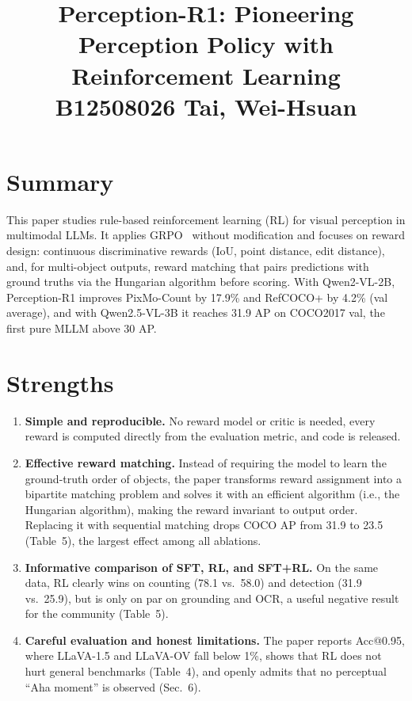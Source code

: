 \documentclass[10pt,twocolumn,letterpaper]{article}
\begin{document}
\title{Perception-R1: Pioneering Perception Policy with Reinforcement Learning\\ B12508026 Tai, Wei-Hsuan}  %

\maketitle
\thispagestyle{empty}
\appendix


\section{Summary}
This paper studies rule-based reinforcement learning (RL) for visual perception in multimodal LLMs.
It applies GRPO~\cite{shao2024deepseekmath} without modification and focuses on reward design: continuous discriminative rewards (IoU, point distance, edit distance), and, for multi-object outputs, reward matching that pairs predictions with ground truths via the Hungarian algorithm before scoring.
With Qwen2-VL-2B, Perception-R1 improves PixMo-Count by 17.9\% and RefCOCO+ by 4.2\% (val average), and with Qwen2.5-VL-3B it reaches 31.9 AP on COCO2017 val, the first pure MLLM above 30 AP.

\section{Strengths}
\begin{enumerate}
    \item \textbf{Simple and reproducible.} No reward model or critic is needed, every reward is computed directly from the evaluation metric, and code is released.
    \item \textbf{Effective reward matching.} Instead of requiring the model to learn the ground-truth order of objects, the paper transforms reward assignment into a bipartite matching problem and solves it with an efficient algorithm (i.e., the Hungarian algorithm), making the reward invariant to output order. Replacing it with sequential matching drops COCO AP from 31.9 to 23.5 (Table~5), the largest effect among all ablations.
    \item \textbf{Informative comparison of SFT, RL, and SFT+RL.} On the same data, RL clearly wins on counting (78.1 vs.\ 58.0) and detection (31.9 vs.\ 25.9), but is only on par on grounding and OCR, a useful negative result for the community (Table~5).
    \item \textbf{Careful evaluation and honest limitations.} The paper reports Acc@0.95, where LLaVA-1.5 and LLaVA-OV fall below 1\%, shows that RL does not hurt general benchmarks (Table~4), and openly admits that no perceptual ``Aha moment'' is observed (Sec.~6).
\end{enumerate}
\end{document}
